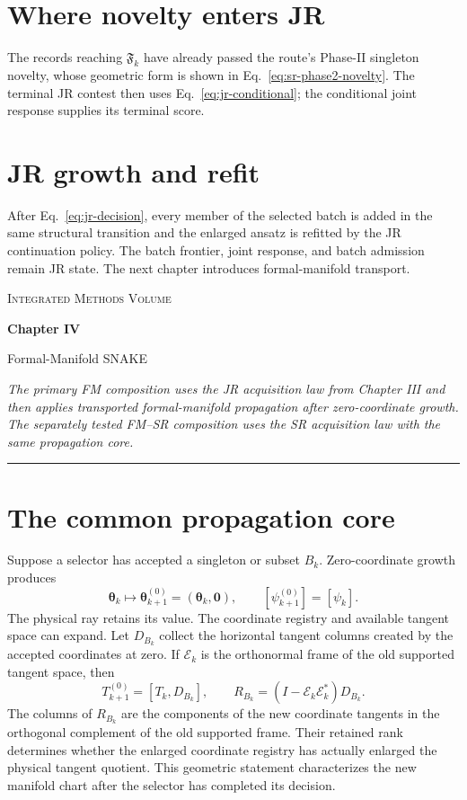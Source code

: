 \documentclass[10pt,twocolumn]{article}
\newcommand{\chapterfront}[3]{%
  \begingroup
  \centering
  {\small\scshape Integrated Methods Volume\par}
  \vspace{0.45em}
  {\Large\bfseries #1\par}
  \vspace{0.25em}
  {\large #2\par}
  \vspace{0.65em}
  \begin{minipage}{0.94\columnwidth}
    \small\itshape #3
  \end{minipage}\par
  \vspace{0.75em}
  \hrule
  \vspace{0.75em}
  \endgroup
}
\begin{document}
\section*{Where novelty enters JR}

The records reaching \(\mathfrak F_k\) have already passed the route's
Phase-II singleton novelty, whose geometric form is shown in
Eq.~\eqref{eq:sr-phase2-novelty}. The terminal JR contest then uses
Eq.~\eqref{eq:jr-conditional}; the conditional joint response supplies its
terminal score.

\section*{JR growth and refit}

After Eq.~\eqref{eq:jr-decision}, every member of the selected batch is added
in the same structural transition and the enlarged ansatz is refitted by the
JR continuation policy. The batch frontier, joint response, and batch
admission remain JR state. The next chapter introduces formal-manifold
transport.

\clearpage
\chapterfront
{Chapter IV}
{Formal-Manifold SNAKE}
{The primary FM composition uses the JR acquisition law from Chapter III and
then applies transported formal-manifold propagation after zero-coordinate
growth. The separately tested FM--SR composition uses the SR acquisition law
with the same propagation core.}

\section*{The common propagation core}

Suppose a selector has accepted a singleton or subset \(B_k\). Zero-coordinate
growth produces
\begin{equation}
\bm\theta_k\longmapsto
\bm\theta_{k+1}^{(0)}=(\bm\theta_k,\bm0),
\qquad [\psi_{k+1}^{(0)}]=[\psi_k].
\label{eq:fm-zero-growth}
\end{equation}
The physical ray retains its value. The coordinate registry and available
tangent space can expand. Let \(D_{B_k}\) collect the horizontal tangent
columns created by the accepted coordinates at zero. If \(\mathcal E_k\) is
the orthonormal frame of the old supported tangent space, then
\begin{equation}
T_{k+1}^{(0)}=[T_k,D_{B_k}],\qquad
R_{B_k}=(I-\mathcal E_k\mathcal E_k^*)D_{B_k}.
\label{eq:fm-zero-growth-tangents}
\end{equation}
The columns of \(R_{B_k}\) are the components of the new coordinate tangents
in the orthogonal complement of the old supported frame. Their retained rank
determines whether the enlarged coordinate registry has actually enlarged the
physical tangent quotient. This geometric statement characterizes the new
manifold chart after the selector has completed its decision.
\end{document}
